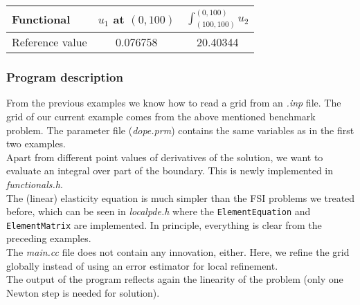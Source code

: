 \begin{table}[h]
\centering
\begin{tabular}{lcc}    
\hline
 Functional & $u_1$ at $(0,100)$ & $\int_{(100,100)}^{(0,100)} u_2$\\
\hline 
 Reference value & 0.076758 & 20.40344\\
\hline
\end{tabular}
\end{table}

\subsubsection{Program description}

From the previous examples we know how to read a grid from an \textit{.inp} file. The grid of our current example comes from the above mentioned benchmark problem. The parameter file (\textit{dope.prm}) contains the same variables as in the first two examples.\\
Apart from different point values of derivatives of the solution, we want to evaluate an integral over part of the boundary.   This is newly implemented in \textit{functionals.h}.\\
The (linear) elasticity equation is much simpler than the FSI problems we treated before, which can be seen in \textit{localpde.h} where the \texttt{ElementEquation} and \texttt{ElementMatrix} are implemented. In principle, everything is clear from the preceding examples.\\
The \textit{main.cc} file does not contain any innovation, either. Here, we refine the grid globally instead of using an error estimator for local refinement.\\
The output of the program reflects again the linearity of the problem (only one Newton step is needed for solution).\\

